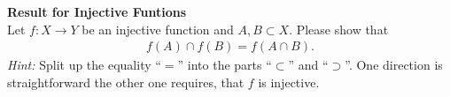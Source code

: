 \textbf{Result for Injective Funtions}\\
Let $f: X \rightarrow Y$ be an injective function and $A,B \subset X$. Please show that
\begin{align*}
f(A) \cap f(B) = f(A \cap B).
\end{align*}
\textit{Hint:} Split up the equality ``$=$'' into the parts ``$\subset$'' and  ``$\supset$''. One direction is straightforward the other one requires, that $f$ is injective.